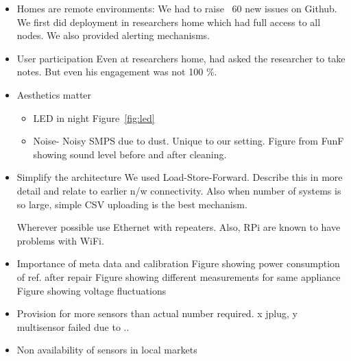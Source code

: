 \documentclass[10pt]{sensys-proc}
\newcommand{\figref}[1]{Figure~\ref{#1}}
\begin{document}
\begin{itemize}
\item Homes are remote environments:
We had to raise ~60 new issues on Github. We first did deployment in researchers home which had full access to all nodes.
We also provided alerting mechanisms.

\item User participation
Even at researchers home, had asked the researcher to take notes. But even his engagement was not 100 \%.

\item Aesthetics matter
\begin{itemize}
\item LED in night \figref{fig:led}
\item Noise- Noisy SMPS due to dust. Unique to our setting. Figure from FunF showing sound level before and after cleaning.
\end{itemize}

\item Simplify the architecture
We used Load-Store-Forward. Describe this in more detail and relate to earlier n/w connectivity.
Also when number of systems is so large, simple CSV uploading is the best mechanism.

Wherever possible use Ethernet with repeaters. Also, RPi are known to have problems with WiFi.

\item Importance of meta data and calibration
Figure showing power consumption of ref. after repair
Figure showing different measurements for same appliance
Figure showing voltage fluctuations

\item Provision for more sensors than actual number required. x jplug, y multisensor failed due to ..
\item Non availability of sensors in local markets

\end{itemize}
\end{document}
